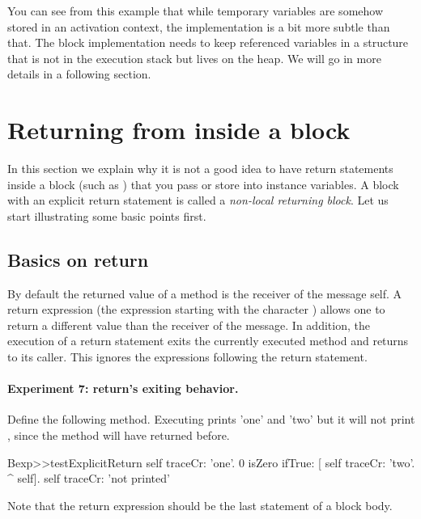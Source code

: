\documentclass[a4paper,10pt,twoside]{book}
\begin{document}
 You can see from this example that while temporary variables are somehow stored in an activation context, the implementation is a bit more subtle than that. The block implementation needs to keep referenced variables in a structure that is not in the execution stack but lives on the heap. We will go in more details in a following section.


\section{Returning from inside a block}
In this section we explain why it is  not a good idea to have return statements inside a block (such as \ct{[^ 33]}) that you pass or store into instance variables. A block with an explicit return statement is called a \emph{non-local returning block}. Let us start illustrating some basic points first.

\subsection{Basics on return}

By default the returned value of a method is the receiver of the message \ie self.
A return expression (the expression starting with the character \ct{^}) allows one to return a different value than the receiver of the message. In addition, the execution of a return statement exits the currently executed method and returns to its caller. This ignores the expressions following the return statement.

\paragraph{Experiment 7: return's exiting behavior.}
Define the following method. Executing   prints 'one' and 'two' but it will not print , since the method  will have returned before.

\begin{code}{}
Bexp>>testExplicitReturn
	self traceCr: 'one'.
	0 isZero ifTrue: [ self traceCr: 'two'. ^ self].
	self traceCr: 'not printed'
\end{code}

Note that the return expression should be the last statement of a block body.
\end{document}
